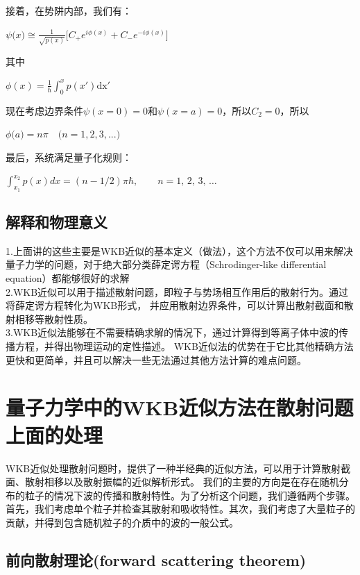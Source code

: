 \documentclass[12pt]{article}
\begin{document}
接着，在势阱内部，我们有：
\begin{center}
    $\displaystyle\psi\big(x\big)\cong\frac{1}{\sqrt{p(x)}}\biggl[C_+e^{i\phi(x)}+C_-e^{-i\phi(x)}\biggr]$
\end{center}
其中
\begin{center}
    $\displaystyle \phi(x) = \frac{1}{\hbar}\int_0^xp(x')\mathrm{dx'}$
\end{center}
现在考虑边界条件$\psi(x=0)=0$和$\psi(x=a)=0$，所以$C_2=0$，所以
\begin{center}
    $\phi\bigl(a\bigr)=n\pi\quad\bigl(n=1,2,3,...\bigr)$
\end{center}
最后，系统满足量子化规则：
\begin{center}
    $\displaystyle \int_{x_1}^{x_2} p(x)dx =(n - 1/2)\pi \hbar,\qquad n=1,\,2,\,3,\,\dots\,\!$
\end{center}

\subsection{解释和物理意义}
1.上面讲的这些主要是WKB近似的基本定义（做法），这个方法不仅可以用来解决量子力学的问题，对于绝大部分类薛定谔方程（Schrodinger-like differential equation）都能够很好的求解
\\
2.WKB近似可以用于描述散射问题，即粒子与势场相互作用后的散射行为。通过将薛定谔方程转化为WKB形式，
并应用散射边界条件，可以计算出散射截面和散射相移等散射性质。
\\
3.WKB近似法能够在不需要精确求解的情况下，通过计算得到等离子体中波的传播方程，并得出物理运动的定性描述。
WKB近似法的优势在于它比其他精确方法更快和更简单，并且可以解决一些无法通过其他方法计算的难点问题。

\section{量子力学中的WKB近似方法在散射问题上面的处理}
WKB近似处理散射问题时，提供了一种半经典的近似方法，可以用于计算散射截面、散射相移以及散射振幅的近似解析形式。
我们的主要的方向是在存在随机分布的粒子的情况下波的传播和散射特性。为了分析这个问题，我们遵循两个步骤。\cite{5472149}
首先，我们考虑单个粒子并检查其散射和吸收特性。其次，我们考虑了大量粒子的贡献，并得到包含随机粒子的介质中的波的一般公式。

\subsection{前向散射理论(forward scattering theorem)}
\end{document}
